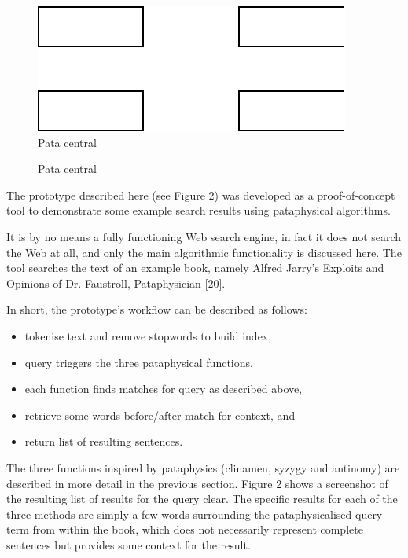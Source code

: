 
\begin{figure}[htb] %
  \centering
  \includegraphics[width=\linewidth]{images/patasearch01}
\caption[Pata central]{Pata central}
\label{fig:patasearch01}
\end{figure}

\begin{figure}[htb] %
  \centering
  
\caption[Pata central]{Pata central}
\label{fig:patasearch01}
\end{figure}

The prototype described here (see Figure 2) was developed as a proof-of-concept tool to demonstrate some example search results using pataphysical algorithms.

It is by no means a fully functioning Web search engine, in fact it does not search the Web at all, and only the main algorithmic functionality is discussed here. The tool searches the text of an example book, namely Alfred Jarry’s Exploits and Opinions of Dr. Faustroll, Pataphysician [20].

In short, the prototype’s workflow can be described as follows:
\begin{itemize}
  \item tokenise text and remove stopwords to build index,
  \item query triggers the three pataphysical functions,
  \item each function finds matches for query as described above,
  \item retrieve some words before/after match for context, and
  \item return list of resulting sentences.
\end{itemize}

The three functions inspired by pataphysics (clinamen, syzygy and antinomy) are described in more detail in the previous section. Figure 2 shows a screenshot of the resulting list of results for the query clear. The specific results for each of the three methods are simply a few words surrounding the pataphysicalised query term from within the book, which does not necessarily represent complete sentences but provides some context for the result.

